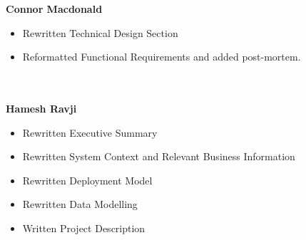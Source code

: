 
\textbf{Connor Macdonald}
\begin{itemize}
	\item Rewritten Technical Design Section
	\item Reformatted Functional Requirements and added post-mortem.
\end{itemize}
\\ \\
\textbf{Hamesh Ravji}
\begin{itemize}
	\item Rewritten Executive Summary
	\item Rewritten System Context and Relevant Business Information
	\item Rewritten Deployment Model
	\item Rewritten Data Modelling
	\item Written Project Description
\end{itemize}